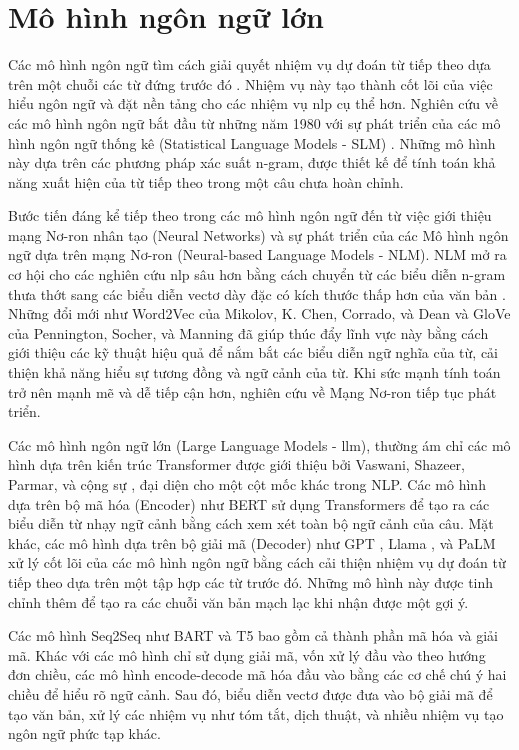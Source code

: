 \section{Mô hình ngôn ngữ lớn}
\label{section:large_language_model}
Các mô hình ngôn ngữ tìm cách giải quyết nhiệm vụ dự đoán từ tiếp theo dựa trên một chuỗi các từ đứng trước đó \cite{zhao2023survey}. Nhiệm vụ này tạo thành cốt lõi của việc hiểu ngôn ngữ và đặt nền tảng cho các nhiệm vụ \gls{nlp} cụ thể hơn. Nghiên cứu về các mô hình ngôn ngữ bắt đầu từ những năm 1980 với sự phát triển của các mô hình ngôn ngữ thống kê (Statistical Language Models - SLM) \cite{rosenfeld2000two}. Những mô hình này dựa trên các phương pháp xác suất n-gram, được thiết kế để tính toán khả năng xuất hiện của từ tiếp theo trong một câu chưa hoàn chỉnh.


Bước tiến đáng kể tiếp theo trong các mô hình ngôn ngữ đến từ việc giới thiệu mạng Nơ-ron nhân tạo (Neural Networks) và sự phát triển của các Mô hình ngôn ngữ dựa trên mạng Nơ-ron (Neural-based Language Models - NLM). NLM mở ra cơ hội cho các nghiên cứu \gls{nlp} sâu hơn bằng cách chuyển từ các biểu diễn n-gram thưa thớt sang các biểu diễn vectơ dày đặc có kích thước thấp hơn của văn bản \cite{bengio2000neural}. Những đổi mới như Word2Vec của Mikolov, K. Chen, Corrado, và Dean \cite{mikolov2013efficient} và GloVe của Pennington, Socher, và Manning \cite{pennington2014glove} đã giúp thúc đẩy lĩnh vực này bằng cách giới thiệu các kỹ thuật hiệu quả để nắm bắt các biểu diễn ngữ nghĩa của từ, cải thiện khả năng hiểu sự tương đồng và ngữ cảnh của từ. Khi sức mạnh tính toán trở nên mạnh mẽ và dễ tiếp cận hơn, nghiên cứu về Mạng Nơ-ron tiếp tục phát triển.


Các mô hình ngôn ngữ lớn (Large Language Models - \gls{llm}), thường ám chỉ các mô hình dựa trên kiến trúc Transformer được giới thiệu bởi Vaswani, Shazeer, Parmar, và cộng sự \cite{vaswani2017attention}, đại diện cho một cột mốc khác trong NLP. Các mô hình dựa trên bộ mã hóa (Encoder) như BERT \cite{devlin2018bert} sử dụng Transformers để tạo ra các biểu diễn từ nhạy ngữ cảnh bằng cách xem xét toàn bộ ngữ cảnh của câu. Mặt khác, các mô hình dựa trên bộ giải mã (Decoder) như GPT \cite{radford2018improving}, Llama \cite{touvron2023llama}, và PaLM \cite{chowdhery2023palm} xử lý cốt lõi của các mô hình ngôn ngữ bằng cách cải thiện nhiệm vụ dự đoán từ tiếp theo dựa trên một tập hợp các từ trước đó. Những mô hình này được tinh chỉnh thêm để tạo ra các chuỗi văn bản mạch lạc khi nhận được một gợi ý.


Các mô hình Seq2Seq như BART \cite{lewis2019bart} và T5 \cite{raffel2020exploring} bao gồm cả thành phần mã hóa và giải mã. Khác với các mô hình chỉ sử dụng giải mã, vốn xử lý đầu vào theo hướng đơn chiều, các mô hình encode-decode mã hóa đầu vào bằng các cơ chế chú ý hai chiều để hiểu rõ ngữ cảnh. Sau đó, biểu diễn vectơ được đưa vào bộ giải mã để tạo văn bản, xử lý các nhiệm vụ như tóm tắt, dịch thuật, và nhiều nhiệm vụ tạo ngôn ngữ phức tạp khác.


